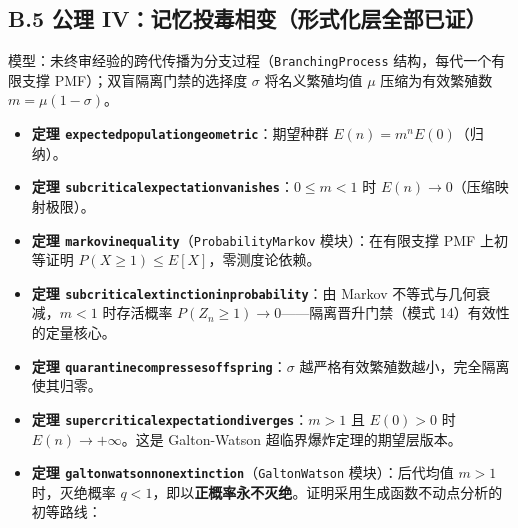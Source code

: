 \documentclass[
]{ctexart}
\providecommand{\tightlist}{%
  \setlength{\itemsep}{0pt}\setlength{\parskip}{0pt}}
\renewcommand{\_}{\discretionary{}{}{\textunderscore}}
\begin{document}
\subsection{B.5 公理
IV：记忆投毒相变（形式化层全部已证）}\label{b.5-ux516cux7406-ivux8bb0ux5fc6ux6295ux6bd2ux76f8ux53d8ux5f62ux5f0fux5316ux5c42ux5168ux90e8ux5df2ux8bc1}

模型：未终审经验的跨代传播为分支过程（\texttt{BranchingProcess}
结构，每代一个有限支撑 PMF）；双盲隔离门禁的选择度 \(\sigma\)
将名义繁殖均值 \(\mu\) 压缩为有效繁殖数 \(m = \mu(1-\sigma)\)。

\begin{itemize}
\tightlist
\item
  \textbf{定理 \texttt{expected\_population\_geometric}}：期望种群
  \(E(n) = m^n E(0)\)（归纳）。
\item
  \textbf{定理
  \texttt{subcritical\_expectation\_vanishes}}：\(0 \le m < 1\) 时
  \(E(n) \to 0\)（压缩映射极限）。
\item
  \textbf{定理
  \texttt{markov\_inequality}}（\texttt{Probability\_Markov}
  模块）：在有限支撑 PMF 上初等证明
  \(P(X \ge 1) \le E[X]\)，零测度论依赖。
\item
  \textbf{定理 \texttt{subcritical\_extinction\_in\_probability}}：由
  Markov 不等式与几何衰减，\(m<1\) 时存活概率
  \(P(Z_n \ge 1) \to 0\)------隔离晋升门禁（模式 14）有效性的定量核心。
\item
  \textbf{定理 \texttt{quarantine\_compresses\_offspring}}：\(\sigma\)
  越严格有效繁殖数越小，完全隔离使其归零。
\item
  \textbf{定理 \texttt{supercritical\_expectation\_diverges}}：\(m>1\)
  且 \(E(0)>0\) 时 \(E(n) \to +\infty\)。这是 Galton-Watson
  超临界爆炸定理的期望层版本。
\item
  \textbf{定理
  \texttt{galton\_watson\_non\_extinction}}（\texttt{GaltonWatson}
  模块）：后代均值 \(m>1\) 时，灭绝概率
  \(q < 1\)，即以\textbf{正概率永不灭绝}。证明采用生成函数不动点分析的初等路线：


\end{itemize}
\end{document}
